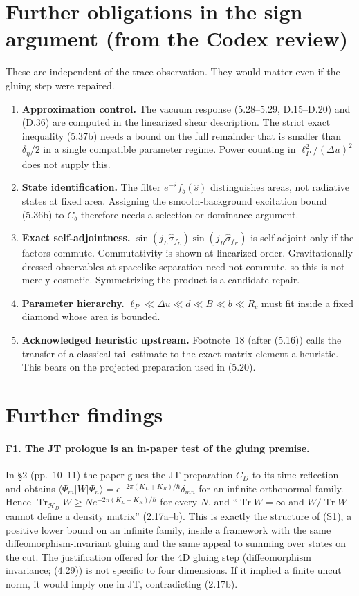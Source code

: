 \documentclass[11pt]{article}
\theoremstyle{remark}
\newcommand{\Tr}{\operatorname{Tr}}
\newcommand{\HD}{\mathcal H_D}
\begin{document}
\section{Further obligations in the sign argument (from the Codex review)}
These are independent of the trace observation. They would matter even if the gluing
step were repaired.
\begin{enumerate}
  \item \textbf{Approximation control.} The vacuum response (5.28--5.29, D.15--D.20)
  and (D.36) are computed in the linearized shear description. The strict exact
  inequality (5.37b) needs a bound on the full remainder that is smaller than
  $\delta_\eta/2$ in a single compatible parameter regime. Power counting in
  $\ell_P^2/(\Delta u)^2$ does not supply this.
  \item \textbf{State identification.} The filter $e^{-\hat s}f_b(\hat s)$ distinguishes
  areas, not radiative states at fixed area. Assigning the smooth-background excitation
  bound (5.36b) to $C_b$ therefore needs a selection or dominance argument.
  \item \textbf{Exact self-adjointness.} $\sin(j_L\hat\sigma_{f_L})\sin(j_R\hat\sigma_{f_R})$
  is self-adjoint only if the factors commute. Commutativity is shown at linearized
  order. Gravitationally dressed observables at spacelike separation need not commute,
  so this is not merely cosmetic. Symmetrizing the product is a candidate repair.
  \item \textbf{Parameter hierarchy.} $\ell_P\ll\Delta u\ll d\ll B\ll b\ll R_c$ must fit
  inside a fixed diamond whose area is bounded.
  \item \textbf{Acknowledged heuristic upstream.} Footnote~18 (after (5.16)) calls the
  transfer of a classical tail estimate to the exact matrix element a heuristic. This
  bears on the projected preparation used in (5.20).
\end{enumerate}

\section{Further findings}\label{sec:more}

\paragraph{F1. The JT prologue is an in-paper test of the gluing premise.}
In \S2 (pp.~10--11) the paper glues the JT preparation $C_D$ to its time reflection and
obtains $\langle\Psi_m|W|\Psi_n\rangle=e^{-2\pi(K_L+K_R)/\hbar}\delta_{mn}$ for an
infinite orthonormal family. Hence $\Tr_{\HD}W\ge N e^{-2\pi(K_L+K_R)/\hbar}$ for
every $N$, and ``$\Tr W=\infty$ and $W/\Tr W$ cannot define a density matrix''
(2.17a--b). This is exactly the structure of (S1), a positive lower bound on an infinite
family, inside a framework with the same diffeomorphism-invariant gluing and the same
appeal to summing over states on the cut. The justification offered for the 4D gluing
step (diffeomorphism invariance; (4.29)) is not specific to four dimensions. If it
implied a finite uncut norm, it would imply one in JT, contradicting (2.17b).
\end{document}
